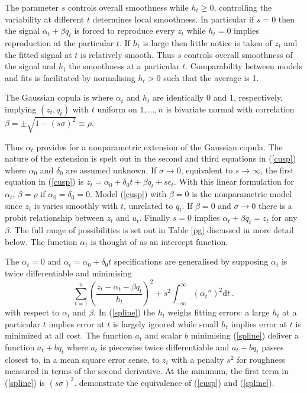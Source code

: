 \documentclass[authoryear]{elsarticle}
\newcommand{\eps}{\epsilon}
\newcommand{\de}{\mathrm{d}}
\newcommand{\eref}[1]{(\ref{#1})}
\newcommand{\tref}[1]{Table \ref{#1}}
\newcommand{\be}[1]{\begin{equation}\label{#1}}
\newcommand{\ee}{\end{equation}}
\begin{document}
The parameter $s$ controls overall smoothness while  $h_t\ge 0$,  controlling the variability at different $t$ determines local smoothness.
In particular if $s=0$ then the signal $\alpha_t+\beta q_t$ is forced to reproduce every  $z_t$ while $h_t=0$ implies reproduction at the particular $t$.     If $h_t$ is large then little notice is taken of $z_t$ and the fitted signal at $t$ is relatively smooth.  Thus $s$ controls overall smoothness of the signal and  $h_t$ the smoothness at a particular $t$.  Comparability between models and fits is facilitated by normalising $h_t>0$ such that the average  is 1.  


The Gaussian copula is where $\alpha_t$ and $h_t$ are  identically 0 and  1, respectively, implying  $(z_t,q_t)$ with $t$ uniform on $1,\ldots,n$  is bivariate normal  with correlation $\beta=\pm\sqrt{1-(s\sigma)^2}\equiv\rho$.    

Thus $\alpha_t$ provides for a nonparametric extension of the Gaussian copula.   The nature of the extension is spelt out in the  second and third equations in \eref{cusp} where $\alpha_0$ and $\delta_0$ are assumed unknown.  If $\sigma\rightarrow 0$, equivalent to $s\rightarrow\infty$,  the first equation in \eref{cusp} is
$
z_t = \alpha_0+\delta_0 t + \beta q_t + s\eps_t
$.
With this linear formulation for $\alpha_t$,  $\beta=\rho$ if $\alpha_0=\delta_0=0$.    Model \eref{cusp} with  $\beta=0$ is the  nonparametric model since $z_t$ is varies smoothly with $t$, unrelated to $q_t$.  If $\beta=0$ and $\sigma\rightarrow 0$ there is a probit relationship between $z_t$ and $u_t$.  Finally $s=0$ implies $\alpha_t+\beta q_t=z_t$ for any $\beta$.   The full range of possibilities is set out in \tref{pg} discussed in more detail below.  The function $\alpha_t$ is thought of as an intercept function. 

The $\alpha_t=0$ and $\alpha_t=\alpha_0+\delta_0 t$ specifications are generalised by supposing $\alpha_t$ is twice differentiable and minimising
\be{spline}
 \sum_{t=1}^n\left(\frac{z_t-\alpha_t-\beta q_t}{h_t}\right)^2 + s^2\int_{-\infty}^{\infty} \left(\alpha_t''\right)^2\de t\ .
\ee
with respect to $\alpha_t$ and $\beta$.
 In \eref{spline} the $h_t$  weighs fitting errors: a large  $h_t$ at a particular $t$ implies  error at $t$ is largely ignored while small $h_t$ implies  error at $t$ is  minimized at all cost.  The function $a_t$ and scalar $b$ minimising \eref{spline} deliver a function $a_t+bq_t$ where $a_t$ is piecewise twice differentiable and $a_t+bq_t$ passes closest to, in a mean square error sense, to $z_t$  with a penalty $s^2$ for  roughness measured in terms of the second derivative.   At the minimum, the first term in \eref{spline} is $(s\sigma)^2$.   \cite{Brown&DeJong:2001} demonstrate the equivalence of \eref{cusp} and \eref{spline}.
\end{document}
